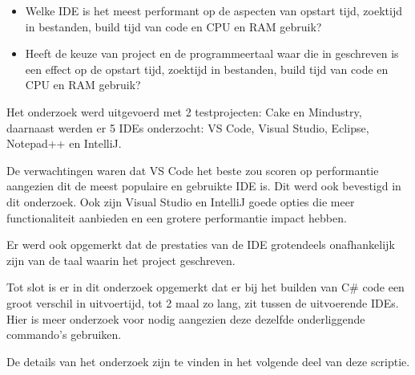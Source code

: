 \begin{itemize}
    \item Welke IDE is het meest performant op de aspecten van opstart tijd, zoektijd in bestanden, build tijd van code en CPU en RAM gebruik?
    \item Heeft de keuze van project en de programmeertaal waar die in geschreven is een effect op de opstart tijd, zoektijd in bestanden, build tijd van code en CPU en RAM gebruik?
\end{itemize}

Het onderzoek werd uitgevoerd met 2 testprojecten: Cake en Mindustry, daarnaast werden er 5 IDEs onderzocht: VS Code, Visual Studio, Eclipse, Notepad++ en IntelliJ.

De verwachtingen waren dat VS Code het beste zou scoren op performantie aangezien dit de meest populaire en gebruikte IDE is. Dit werd ook bevestigd in dit onderzoek. Ook zijn Visual Studio en IntelliJ goede opties die meer functionaliteit aanbieden en een grotere performantie impact hebben.

Er werd ook opgemerkt dat de prestaties van de IDE grotendeels onafhankelijk zijn van de taal waarin het project geschreven.

Tot slot is er in dit onderzoek opgemerkt dat er bij het builden van C\# code een groot verschil in uitvoertijd, tot 2 maal zo lang, zit tussen de uitvoerende IDEs. Hier is meer onderzoek voor nodig aangezien deze dezelfde onderliggende commando's gebruiken.

De details van het onderzoek zijn te vinden in het volgende deel van deze scriptie.
